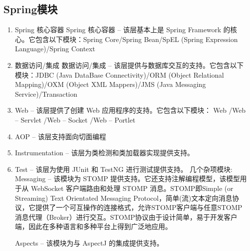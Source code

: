 \documentclass[../../../interview-questions.tex]{subfiles}
\begin{document}
\subsection{Spring模块}

\begin{enumerate}
    \item {Spring 核心容器}
Spring 核心容器 – 该层基本上是 Spring Framework 的核心。它包含以下模块：Spring Core/Spring Bean/SpEL (Spring Expression Language)/Spring Context
    \item{数据访问/集成}
数据访问/集成 – 该层提供与数据库交互的支持。它包含以下模块：JDBC (Java DataBase Connectivity)/ORM (Object Relational Mapping)/OXM (Object XML Mappers)/JMS (Java Messaging Service)/Transaction
\item{Web – 该层提供了创建 Web 应用程序的支持。}它包含以下模块：
Web
/Web – Servlet
/Web – Socket
/Web – Portlet
\item{AOP – 该层支持面向切面编程}
\item{Instrumentation – 该层为类检测和类加载器实现提供支持。}
\item{Test – 该层为使用 JUnit 和 TestNG 进行测试提供支持。}
几个杂项模块:
Messaging – 该模块为 STOMP 提供支持。它还支持注解编程模型，该模型用于从 WebSocket 客户端路由和处理 STOMP 消息。STOMP即Simple (or Streaming) Text Orientated Messaging Protocol，简单(流)文本定向消息协议，它提供了一个可互操作的连接格式，允许STOMP客户端与任意STOMP消息代理（Broker）进行交互。STOMP协议由于设计简单，易于开发客户端，因此在多种语言和多种平台上得到广泛地应用。

Aspects – 该模块为与 AspectJ 的集成提供支持。
\end{enumerate}
\end{document}
